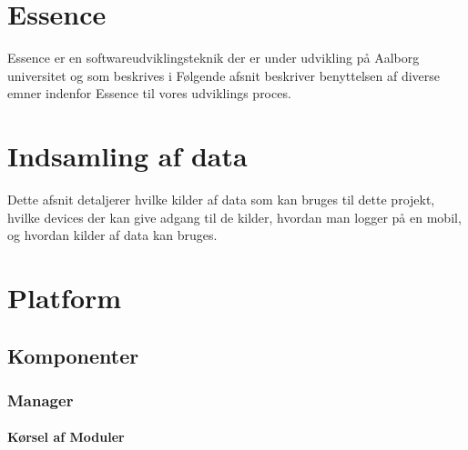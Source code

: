 












\chapter{Essence}
Essence er en softwareudviklingsteknik der er under udvikling på Aalborg universitet og som beskrives i \citet{art:essence}
Følgende afsnit beskriver benyttelsen af diverse emner indenfor Essence til vores udviklings proces.


%



\chapter{Indsamling af data}
Dette afsnit detaljerer hvilke kilder af data som kan bruges til dette projekt, hvilke devices der kan give adgang til de kilder, hvordan man logger på en mobil, og hvordan kilder af data kan bruges.






\chapter{Platform}





\section{Komponenter}

\subsection{Manager}

\subsubsection{Kørsel af Moduler}

